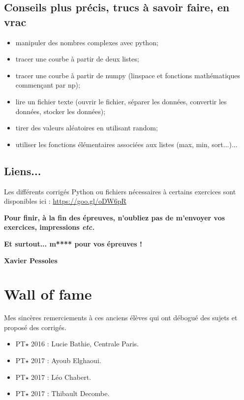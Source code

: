 \documentclass[10pt,fleqn]{article} %
\begin{document}
{\subsection*{Conseils plus précis, trucs à savoir faire, en vrac}
\begin{itemize}
\item manipuler des nombres complexes avec python;
\item tracer une courbe à partir de deux listes;
\item tracer une courbe à partir de numpy (linspace et fonctions mathématiques commençant par np);
\item lire un fichier texte (ouvrir le fichier, séparer les données, convertir les données, stocker les données);
\item tirer des valeurs aléatoires en utilisant random;
\item utiliser les fonctions élémentaires associées aux listes (max, min, sort...)...
\end{itemize}
\subsection*{Liens...}


Les différents corrigés Python ou fichiers nécessaires à certains exercices sont disponibles ici : \url{https://goo.gl/oDW6pR}


\begin{flushright}
\textbf{Pour finir, à la fin des épreuves, n'oubliez pas de m'envoyer vos exercices, impressions \textit{etc.}}

\textbf{Et surtout... m**** pour vos épreuves !}

\textbf{Xavier Pessoles}
\end{flushright}}

\normalsize

\section{Wall of fame}

\footnotesize
Mes sincères remerciements à ces anciens élèves qui ont débogué des sujets et proposé des corrigés. 
 
\begin{multicols}{3}

\begin{itemize}
\item PT$\star$ 2016 : Lucie Bathie, Centrale Paris.
\item PT$\star$ 2017 : Ayoub Elghaoui.
\item PT$\star$ 2017 : Léo Chabert.
\item PT$\star$ 2017 : Thibault Decombe.
\end{itemize}
\end{multicols}
\end{document}

